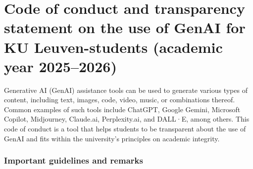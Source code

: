 \chapter*{Code of conduct and transparency statement on the use of GenAI for KU Leuven-students (academic year 2025--2026)}
Generative AI (GenAI) assistance tools can be used to generate various types of content, including text, images, code, video, music, or combinations thereof. Common examples of such tools include ChatGPT, Google Gemini, Microsoft Copilot, Midjourney, Claude.ai, Perplexity.ai, and DALL·E, among others.
\newline
\newline
This code of conduct is a tool that helps students to be transparent about the use of GenAI and fits within the university’s principles on academic integrity.

\subsection*{Important guidelines and remarks}

